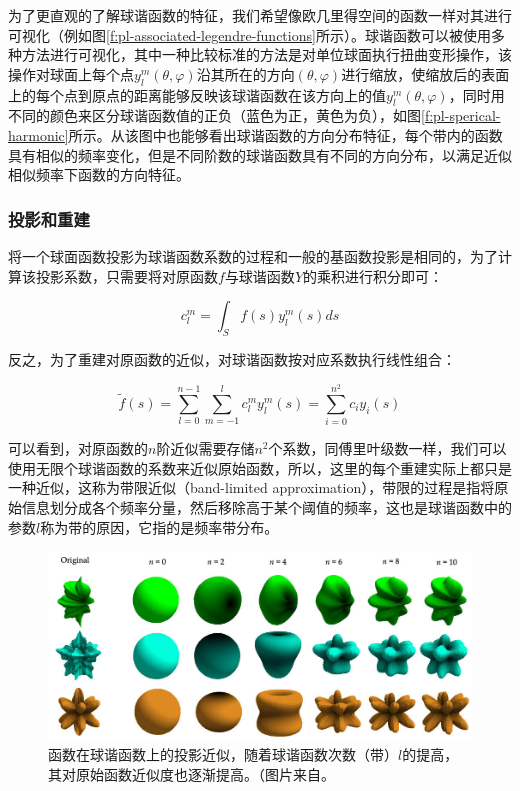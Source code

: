 为了更直观的了解球谐函数的特征，我们希望像欧几里得空间的函数一样对其进行可视化（例如图\ref{f:pl-associated-legendre-functions}所示）。球谐函数可以被使用多种方法进行可视化，其中一种比较标准的方法是对单位球面执行扭曲变形操作，该操作对球面上每个点$y^{m}_l(\theta,\varphi)$沿其所在的方向$(\theta,\varphi)$进行缩放，使缩放后的表面上的每个点到原点的距离能够反映该球谐函数在该方向上的值$y^{m}_l(\theta,\varphi)$，同时用不同的颜色来区分球谐函数值的正负（蓝色为正，黄色为负），如图\ref{f:pl-sperical-harmonic}所示。从该图中也能够看出球谐函数的方向分布特征，每个带内的函数具有相似的频率变化，但是不同阶数的球谐函数具有不同的方向分布，以满足近似相似频率下函数的方向特征。




\subsubsection{投影和重建}
将一个球面函数投影为球谐函数系数的过程和一般的基函数投影是相同的，为了计算该投影系数，只需要将对原函数$f$与球谐函数$Y$的乘积进行积分即可：

\begin{equation}
	c_{l}^{m}=\int_{S}f(s)y^{m}_{l}(s)ds
\end{equation}

反之，为了重建对原函数的近似，对球谐函数按对应系数执行线性组合：

\begin{equation}
	\tilde{f}(s)=\sum^{n-1}_{l=0}\sum^{l}_{m=-1}c^{m}_{l}y^{m}_{l}(s)=\sum^{n^{2}}_{i=0}c_iy_i(s)
\end{equation}

可以看到，对原函数的$n$阶近似需要存储$n^{2}$个系数，同傅里叶级数一样，我们可以使用无限个球谐函数的系数来近似原始函数，所以，这里的每个重建实际上都只是一种近似，这称为带限近似（band-limited approximation），带限的过程是指将原始信息划分成各个频率分量，然后移除高于某个阈值的频率，这也是球谐函数中的参数$l$称为带的原因，它指的是频率带分布。

\begin{figure}
\begin{fullwidth}
	\includegraphics[width=1.0\thewidth]{figures/prt/prt-6-2}
	\caption{函数在球谐函数上的投影近似，随着球谐函数次数（带）$l$的提高，其对原始函数近似度也逐渐提高。（图片来自\cite{a:SphericalHarmonicLightingTheGrittyDetails}。}
	\label{f:pl-band-limited-approximation}
\end{fullwidth}
\end{figure}

